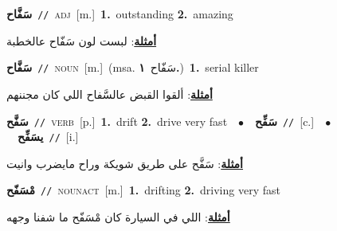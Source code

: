 \documentclass[10pt,a4paper,twoside]{article} %
\begin{document}
\begin{multicols}{2}
{\setlength\topsep{0pt}\textbf{\foreignlanguage{arabic}{سَفَّاح}}\ {\color{gray}\texttt{//}\color{black}}\ \textsc{adj}\ [m.]\ \textbf{1.}~outstanding  \textbf{2.}~amazing\  \begin{flushright}\color{gray}\foreignlanguage{arabic}{\textbf{\underline{\foreignlanguage{arabic}{أمثلة}}}: لبست لون سَفّاح عالخطبة}\end{flushright}\color{black}} \vspace{2mm}

{\setlength\topsep{0pt}\textbf{\foreignlanguage{arabic}{سَفَّاح}}\ {\color{gray}\texttt{//}\color{black}}\ \textsc{noun}\ [m.]\ \color{gray}(msa. \foreignlanguage{arabic}{سَفّاح}~\foreignlanguage{arabic}{\textbf{١.}})\color{black}\ \textbf{1.}~serial killer\  \begin{flushright}\color{gray}\foreignlanguage{arabic}{\textbf{\underline{\foreignlanguage{arabic}{أمثلة}}}: ألقوا القبض عالسَّفاح اللي كان مجننهم}\end{flushright}\color{black}} \vspace{2mm}

{\setlength\topsep{0pt}\textbf{\foreignlanguage{arabic}{سَفَّح}}\ {\color{gray}\texttt{//}\color{black}}\ \textsc{verb}\ [p.]\ \textbf{1.}~drift  \textbf{2.}~drive very fast\ \ $\bullet$\ \ \setlength\topsep{0pt}\textbf{\foreignlanguage{arabic}{سَفِّح}}\ {\color{gray}\texttt{//}\color{black}}\ [c.]\ \ $\bullet$\ \ \setlength\topsep{0pt}\textbf{\foreignlanguage{arabic}{يسَفِّح}}\ {\color{gray}\texttt{//}\color{black}}\ [i.]\  \begin{flushright}\color{gray}\foreignlanguage{arabic}{\textbf{\underline{\foreignlanguage{arabic}{أمثلة}}}: سَفَّح على طريق شويكة وراح مايضرب وانيت}\end{flushright}\color{black}} \vspace{2mm}

{\setlength\topsep{0pt}\textbf{\foreignlanguage{arabic}{مْسَفّح}}\ {\color{gray}\texttt{//}\color{black}}\ \textsc{noun\textunderscore act}\ [m.]\ \textbf{1.}~drifting  \textbf{2.}~driving very fast\  \begin{flushright}\color{gray}\foreignlanguage{arabic}{\textbf{\underline{\foreignlanguage{arabic}{أمثلة}}}: اللي في السيارة كان مْسَفّح ما شفنا وجهه}\end{flushright}\color{black}} \vspace{2mm}


\end{multicols}
\end{document}
